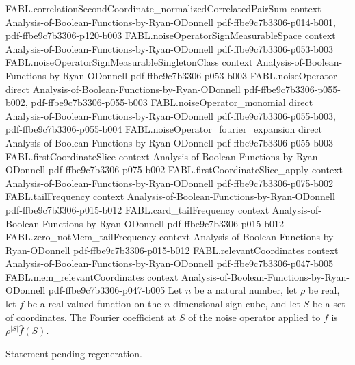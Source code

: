 \begin{theorem}
\proofstep
  {FABL.correlationSecondCoordinate_normalizedCorrelatedPairSum}
  {context}
  {Analysis-of-Boolean-Functions-by-Ryan-ODonnell}
  {pdf-ffbe9c7b3306-p014-b001,
    pdf-ffbe9c7b3306-p120-b003}
\proofstep
  {FABL.noiseOperatorSignMeasurableSpace}
  {context}
  {Analysis-of-Boolean-Functions-by-Ryan-ODonnell}
  {pdf-ffbe9c7b3306-p053-b003}
\proofstep
  {FABL.noiseOperatorSignMeasurableSingletonClass}
  {context}
  {Analysis-of-Boolean-Functions-by-Ryan-ODonnell}
  {pdf-ffbe9c7b3306-p053-b003}
\proofstep
  {FABL.noiseOperator}
  {direct}
  {Analysis-of-Boolean-Functions-by-Ryan-ODonnell}
  {pdf-ffbe9c7b3306-p055-b002,
    pdf-ffbe9c7b3306-p055-b003}
\proofstep
  {FABL.noiseOperator_monomial}
  {direct}
  {Analysis-of-Boolean-Functions-by-Ryan-ODonnell}
  {pdf-ffbe9c7b3306-p055-b003,
    pdf-ffbe9c7b3306-p055-b004}
\proofstep
  {FABL.noiseOperator_fourier_expansion}
  {direct}
  {Analysis-of-Boolean-Functions-by-Ryan-ODonnell}
  {pdf-ffbe9c7b3306-p055-b003}
\proofstep
  {FABL.firstCoordinateSlice}
  {context}
  {Analysis-of-Boolean-Functions-by-Ryan-ODonnell}
  {pdf-ffbe9c7b3306-p075-b002}
\proofstep
  {FABL.firstCoordinateSlice_apply}
  {context}
  {Analysis-of-Boolean-Functions-by-Ryan-ODonnell}
  {pdf-ffbe9c7b3306-p075-b002}
\proofstep
  {FABL.tailFrequency}
  {context}
  {Analysis-of-Boolean-Functions-by-Ryan-ODonnell}
  {pdf-ffbe9c7b3306-p015-b012}
\proofstep
  {FABL.card_tailFrequency}
  {context}
  {Analysis-of-Boolean-Functions-by-Ryan-ODonnell}
  {pdf-ffbe9c7b3306-p015-b012}
\proofstep
  {FABL.zero_notMem_tailFrequency}
  {context}
  {Analysis-of-Boolean-Functions-by-Ryan-ODonnell}
  {pdf-ffbe9c7b3306-p015-b012}
\proofstep
  {FABL.relevantCoordinates}
  {context}
  {Analysis-of-Boolean-Functions-by-Ryan-ODonnell}
  {pdf-ffbe9c7b3306-p047-b005}
\proofstep
  {FABL.mem_relevantCoordinates}
  {context}
  {Analysis-of-Boolean-Functions-by-Ryan-ODonnell}
  {pdf-ffbe9c7b3306-p047-b005}
Let $n$ be a natural number, let $\rho$ be real, let $f$ be a real-valued function on
the $n$-dimensional sign cube, and let $S$ be a set of coordinates. The Fourier
coefficient at $S$ of the noise operator applied to $f$ is $\rho^{|S|}\widehat f(S)$.
\end{theorem}

\begin{theorem}
\label{FABL.noiseOperator_comp}
\leanok
{}
Statement pending regeneration.
\end{theorem}

